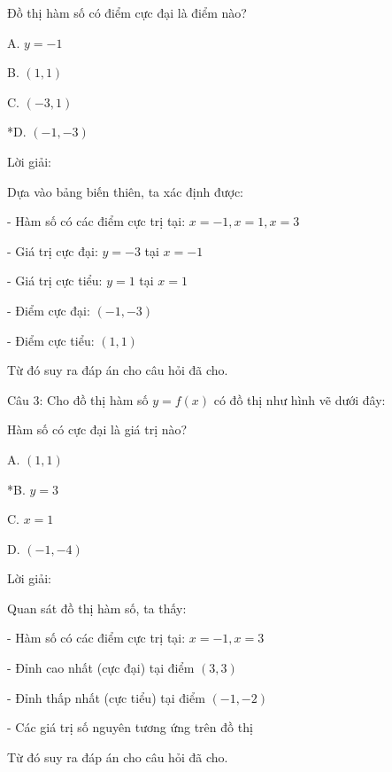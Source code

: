 \documentclass[a4paper,12pt]{article}
\begin{document}
Đồ thị hàm số có điểm cực đại là điểm nào?

A. \(y=-1\)

B. \((1,1)\)

C. \((-3,1)\)

*D. \((-1,-3)\)

Lời giải:


Dựa vào bảng biến thiên, ta xác định được:

- Hàm số có các điểm cực trị tại: \(x = -1, x = 1, x = 3\)

- Giá trị cực đại: \(y = -3\) tại \(x = -1\)

- Giá trị cực tiểu: \(y = 1\) tại \(x = 1\)

- Điểm cực đại: \((-1, -3)\)

- Điểm cực tiểu: \((1, 1)\)

Từ đó suy ra đáp án cho câu hỏi đã cho.




Câu 3: Cho đồ thị hàm số \(y=f(x)\) có đồ thị như hình vẽ dưới đây:




Hàm số có cực đại là giá trị nào?

A. \((1,1)\)

*B. \(y=3\)

C. \(x=1\)

D. \((-1,-4)\)

Lời giải:


            Quan sát đồ thị hàm số, ta thấy:

- Hàm số có các điểm cực trị tại: \(x = -1, x = 3\)

- Đỉnh cao nhất (cực đại) tại điểm \((3, 3)\)

- Đỉnh thấp nhất (cực tiểu) tại điểm \((-1, -2)\)

- Các giá trị số nguyên tương ứng trên đồ thị

Từ đó suy ra đáp án cho câu hỏi đã cho.
\end{document}
